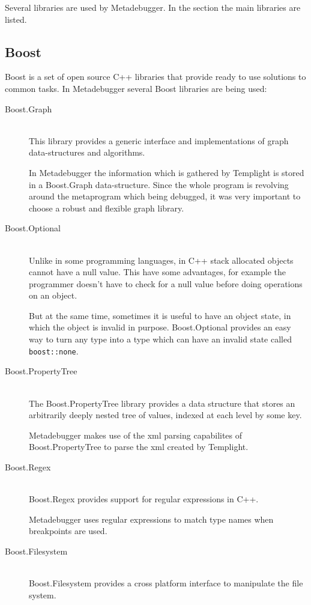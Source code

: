 Several libraries are used by Metadebugger. In the section the main libraries
are listed.

\subsection{Boost\cite{boost}}

Boost is a set of open source C++ libraries that provide ready to use solutions
to common tasks. In Metadebugger several Boost libraries are being used:
\begin{description}
    \item[Boost.Graph]\cite{boost-graph} \hfill \\
        This library provides a generic interface and implementations of graph
        data-structures and algorithms.

        In Metadebugger the information which is gathered by Templight is
        stored in a Boost.Graph data-structure. Since the whole program is
        revolving around the metaprogram which being debugged, it was very
        important to choose a robust and flexible graph library.
    \item[Boost.Optional]\cite{boost-optional} \hfill \\
        Unlike in some programming languages, in C++ stack allocated objects
        cannot have a null value. This have some advantages, for example the
        programmer doesn't have to check for a null value before doing
        operations on an object.

        But at the same time, sometimes it is useful to have an object state,
        in which the object is invalid in purpose. Boost.Optional provides an
        easy way to turn any type into a type which can have an invalid state
        called \texttt{boost::none}.
    \item[Boost.PropertyTree]\cite{boost-pt} \hfill \\
        The Boost.PropertyTree library provides a data structure that stores an
        arbitrarily deeply nested tree of values, indexed at each level by some
        key.

        Metadebugger makes use of the xml parsing capabilites of
        Boost.PropertyTree to parse the xml created by Templight.
    \item[Boost.Regex]\cite{boost-regex} \hfill \\
        Boost.Regex provides support for regular expressions in C++.

        Metadebugger uses regular expressions to match type names when
        breakpoints are used.
    \item[Boost.Filesystem]\cite{boost-fs} \hfill \\
        Boost.Filesystem provides a cross platform interface to manipulate the
        file system.


\end{description}
